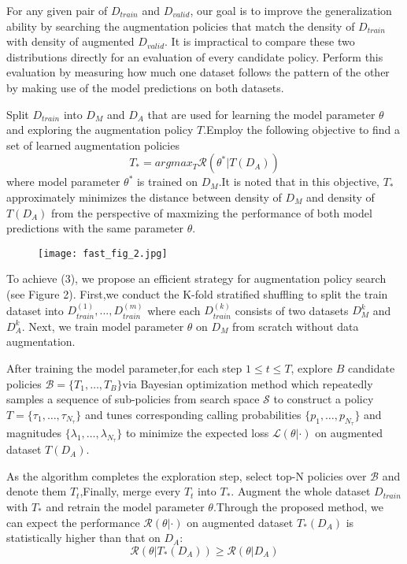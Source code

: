For any given pair of $D_{train}$ and $D_{valid}$, our goal is to improve the generalization ability by searching
the augmentation policies that match the density of $D_{train}$ with density of augmented $D_{valid}$.
It is impractical to compare these two distributions directly for an evaluation of every candidate policy.
Perform this evaluation by measuring how much one dataset follows the pattern of the other by making use of the model predictions on both datasets.

Split $D_{train}$ into $D_{M}$ and $D_{A}$ that are used for learning the model parameter $\theta$ and exploring the augmentation policy $T$.Employ the following objective to find a set of learned augmentation policies
\begin{equation}
T_{*}=argmax_T \mathcal{R}(\theta^*|T(D_A))
\end{equation}
where model parameter $\theta^*$ is trained on $D_{M}$.It is noted that in this objective, $T_{*}$ approximately minimizes the distance between density of $D_{M}$ and density of $T(D_A)$ from the perspective of maxmizing the performance of both model predictions with the same parameter $\theta$.
\begin{figure}[H]
	\centering
	\texttt{[image: fast\_fig\_2.jpg]}
\end{figure}

To achieve (3), we propose an efficient strategy for augmentation policy search (see Figure 2). First,we conduct the K-fold stratified shuffling to split the train dataset into $D_{train}^{(1)},...,D_{train}^{(m)}$ where each $D_{train}^{(k)}$ consists of two datasets $D_M^{k}$ and $D_A^{k}$. Next, we train model parameter $\theta$ on $D_M$ from scratch without data augmentation.

After training the model parameter,for each step $1\leq t\leq T$, explore $B$ candidate policies
$\mathcal{B}=\{T_1,\ldots,T_B\}$via Bayesian optimization method which repeatedly samples a sequence of
sub-policies from search space $\mathcal{S}$ to construct a policy $T=\{\tau_1,\ldots,\tau_{N_\tau}\}$ and tunes corresponding
calling probabilities $\{p_1,\ldots,p_{N_\tau}\}$ and magnitudes $\{\lambda_1,\ldots,\lambda_{N_\tau}\}$ to minimize the expected loss
$\mathcal{L}(\theta |\cdot)$ on augmented dataset $T(D_A)$.

As the algorithm completes the exploration step, select top-N policies over $\mathcal{B}$ and denote them $T_t$,Finally, merge every $T_t$ into $T_*$. Augment the whole dataset $D_{train}$ with $T_*$ and retrain the model parameter $\theta$.Through the proposed method, we can expect the performance $\mathcal{R}(\theta|\cdot)$ on augmented dataset $T_*(D_A)$
is statistically higher than that on $D_A$:
\begin{equation}
\mathcal{R}(\theta|T_*(D_A))\geq\mathcal{R}(\theta|D_A)
\end{equation}

